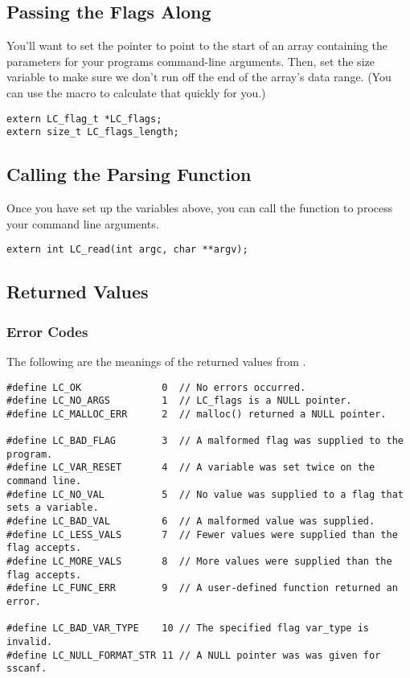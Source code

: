
\subsection{Passing the Flags Along}

You'll want to set the pointer to point to the start of an array containing the parameters for your programs command-line arguments. Then, set the size variable to make sure we don't run off the end of the array's data range. (You can use the  macro to calculate that quickly for you.)

\begin{verbatim}
extern LC_flag_t *LC_flags;
extern size_t LC_flags_length;
\end{verbatim}

\subsection{Calling the Parsing Function}

Once you have set up the variables above, you can call the  function to process your command line arguments.

\begin{verbatim}
extern int LC_read(int argc, char **argv);
\end{verbatim}

\subsection{Returned Values}

\subsubsection{Error Codes}

The following are the meanings of the returned values from .

\begin{verbatim}
#define LC_OK              0  // No errors occurred.
#define LC_NO_ARGS         1  // LC_flags is a NULL pointer.
#define LC_MALLOC_ERR      2  // malloc() returned a NULL pointer.

#define LC_BAD_FLAG        3  // A malformed flag was supplied to the program.
#define LC_VAR_RESET       4  // A variable was set twice on the command line.
#define LC_NO_VAL          5  // No value was supplied to a flag that sets a variable.
#define LC_BAD_VAL         6  // A malformed value was supplied.
#define LC_LESS_VALS       7  // Fewer values were supplied than the flag accepts.
#define LC_MORE_VALS       8  // More values were supplied than the flag accepts.
#define LC_FUNC_ERR        9  // A user-defined function returned an error.

#define LC_BAD_VAR_TYPE    10 // The specified flag var_type is invalid.
#define LC_NULL_FORMAT_STR 11 // A NULL pointer was was given for sscanf.
\end{verbatim}

